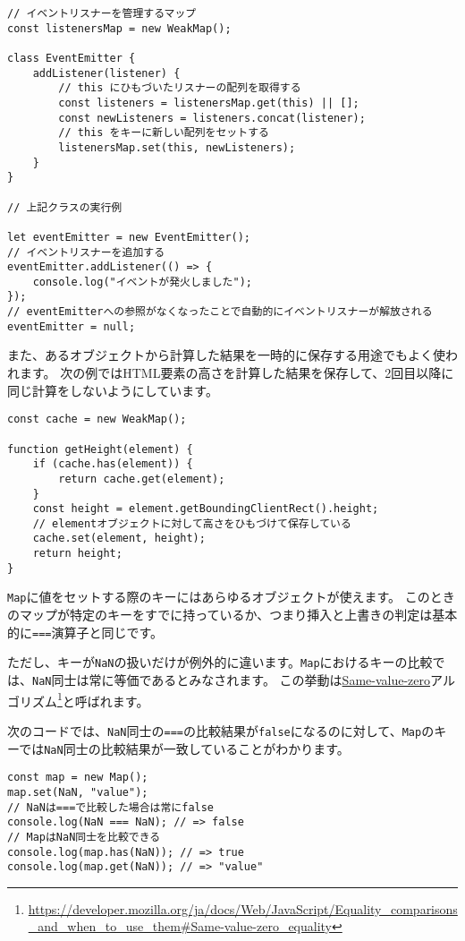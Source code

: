 \begin{lstlisting}
// イベントリスナーを管理するマップ
const listenersMap = new WeakMap();

class EventEmitter {
    addListener(listener) {
        // this にひもづいたリスナーの配列を取得する
        const listeners = listenersMap.get(this) || [];
        const newListeners = listeners.concat(listener);
        // this をキーに新しい配列をセットする
        listenersMap.set(this, newListeners);
    }
}

// 上記クラスの実行例

let eventEmitter = new EventEmitter();
// イベントリスナーを追加する
eventEmitter.addListener(() => {
    console.log("イベントが発火しました");
});
// eventEmitterへの参照がなくなったことで自動的にイベントリスナーが解放される
eventEmitter = null;
\end{lstlisting}

また、あるオブジェクトから計算した結果を一時的に保存する用途でもよく使われます。
次の例ではHTML要素の高さを計算した結果を保存して、2回目以降に同じ計算をしないようにしています。

\begin{lstlisting}
const cache = new WeakMap();

function getHeight(element) {
    if (cache.has(element)) {
        return cache.get(element);
    }
    const height = element.getBoundingClientRect().height;
    // elementオブジェクトに対して高さをひもづけて保存している
    cache.set(element, height);
    return height;
}
\end{lstlisting}

\begin{tcolorbox}[enhanced jigsaw,breakable,title=キーの等価性とNaN]\label{key-and-nan}

\texttt{Map}に値をセットする際のキーにはあらゆるオブジェクトが使えます。
このときのマップが特定のキーをすでに持っているか、つまり挿入と上書きの判定は基本的に\texttt{===}演算子と同じです。

ただし、キーが\texttt{NaN}の扱いだけが例外的に違います。\texttt{Map}におけるキーの比較では、\texttt{NaN}同士は常に等価であるとみなされます。
この挙動は\href{https://developer.mozilla.org/ja/docs/Web/JavaScript/Equality_comparisons_and_when_to_use_them\#Same-value-zero_equality}{Same-value-zero}アルゴリズム\footnote{\url{https://developer.mozilla.org/ja/docs/Web/JavaScript/Equality_comparisons_and_when_to_use_them\#Same-value-zero_equality}}と呼ばれます。

次のコードでは、\texttt{NaN}同士の\texttt{===}の比較結果が\texttt{false}になるのに対して、\texttt{Map}のキーでは\texttt{NaN}同士の比較結果が一致していることがわかります。

\begin{lstlisting}
const map = new Map();
map.set(NaN, "value");
// NaNは===で比較した場合は常にfalse
console.log(NaN === NaN); // => false
// MapはNaN同士を比較できる
console.log(map.has(NaN)); // => true
console.log(map.get(NaN)); // => "value"
\end{lstlisting}
\end{tcolorbox}

